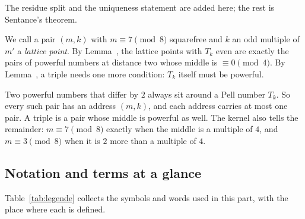 The residue split and the uniqueness statement are added here; the rest is Sentance's theorem.

We call a pair $(m, k)$ with $m \equiv 7 \pmod 8$ squarefree and $k$ an odd multiple of $m'$ a \emph{lattice point}. By
Lemma~, the lattice points with $T_k$ even are exactly the pairs of powerful numbers at distance two whose middle is
$\equiv 0 \pmod 4$. By Lemma~, a triple needs one more condition: $T_k$ itself must be powerful.

\inwords Two powerful numbers that differ by $2$ always sit around a Pell number $T_k$. So every such pair has an address $(m, k)$, and each
address carries at most one pair. A triple is a pair whose middle is powerful as well. The kernel also tells the remainder: $m \equiv 7
\pmod 8$ exactly when the middle is a multiple of $4$, and $m \equiv 3 \pmod 8$ when it is $2$ more than a multiple of $4$.

\subsection{Notation and terms at a glance}

Table~\ref{tab:legende} collects the symbols and words used in this part, with the place where each is defined.

